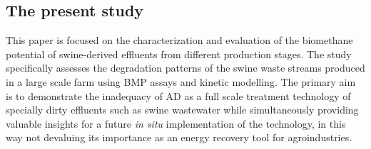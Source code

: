 \subsection{The present study}
This paper is focused on the characterization and evaluation of the biomethane potential of swine-derived effluents from different production stages. The study specifically assesses the degradation patterns of the swine waste streams produced in a large scale farm using BMP assays and kinetic modelling. The primary aim is to demonstrate the inadequacy of AD as a full scale treatment technology of specially dirty effluents such as swine wastewater while simultaneously providing valuable insights for a future \textit{in situ} implementation of the technology, in this way not devaluing its importance as an energy recovery tool for agroindustries.